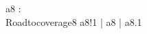 \begin{circus}
\circchannel a8 : \nat \\
\circprocess Roadtocoverage8 \circdef \circbegin
	\circspot
	    a8!1 \then \Skip \lpar | \lchanset a8 \rchanset | \rpar a8.1 \then \Skip
	    \\
	\circend
\end{circus}
